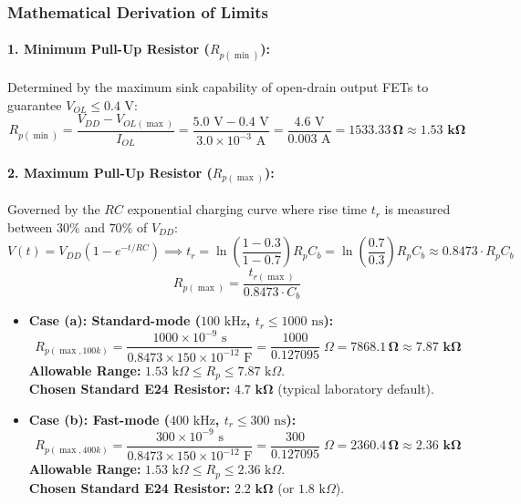 \documentclass[11pt,a4paper]{article}
\begin{document}
\subsubsection*{Mathematical Derivation of Limits}
\paragraph{1. Minimum Pull-Up Resistor ($R_{p(\min)}$):}
Determined by the maximum sink capability of open-drain output FETs to guarantee $V_{OL} \le 0.4\text{ V}$:
\begin{equation}
R_{p(\min)} = \frac{V_{DD} - V_{OL(\max)}}{I_{OL}} = \frac{5.0\text{ V} - 0.4\text{ V}}{3.0\times 10^{-3}\text{ A}} = \frac{4.6\text{ V}}{0.003\text{ A}} = \mathbf{1533.33\,\Omega} \approx \mathbf{1.53\text{ k}\Omega}
\end{equation}

\paragraph{2. Maximum Pull-Up Resistor ($R_{p(\max)}$):}
Governed by the $RC$ exponential charging curve where rise time $t_r$ is measured between $30\%$ and $70\%$ of $V_{DD}$:
\begin{equation}
V(t) = V_{DD}\left(1 - e^{-t/RC}\right) \implies t_r = \ln\left(\frac{1 - 0.3}{1 - 0.7}\right) R_p C_b = \ln\left(\frac{0.7}{0.3}\right) R_p C_b \approx 0.8473 \cdot R_p C_b
\end{equation}
\begin{equation}
R_{p(\max)} = \frac{t_{r(\max)}}{0.8473 \cdot C_b}
\end{equation}

\begin{itemize}
    \item \textbf{Case (a): Standard-mode ($100\text{ kHz}$, $t_r \le 1000\text{ ns}$):}
    \begin{equation}
    R_{p(\max, 100k)} = \frac{1000\times 10^{-9}\text{ s}}{0.8473 \times 150\times 10^{-12}\text{ F}} = \frac{1000}{0.127095}\;\Omega = \mathbf{7868.1\,\Omega} \approx \mathbf{7.87\text{ k}\Omega}
    \end{equation}
    \textbf{Allowable Range:} $1.53\text{ k}\Omega \le R_p \le 7.87\text{ k}\Omega$. \\
    \textbf{Chosen Standard E24 Resistor:} $\mathbf{4.7\text{ k}\Omega}$ (typical laboratory default).

    \item \textbf{Case (b): Fast-mode ($400\text{ kHz}$, $t_r \le 300\text{ ns}$):}
    \begin{equation}
    R_{p(\max, 400k)} = \frac{300\times 10^{-9}\text{ s}}{0.8473 \times 150\times 10^{-12}\text{ F}} = \frac{300}{0.127095}\;\Omega = \mathbf{2360.4\,\Omega} \approx \mathbf{2.36\text{ k}\Omega}
    \end{equation}
    \textbf{Allowable Range:} $1.53\text{ k}\Omega \le R_p \le 2.36\text{ k}\Omega$. \\
    \textbf{Chosen Standard E24 Resistor:} $\mathbf{2.2\text{ k}\Omega}$ (or $1.8\text{ k}\Omega$).
\end{itemize}
\end{document}
